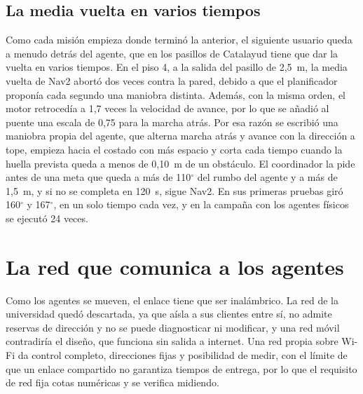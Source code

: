 \subsection{La media vuelta en varios tiempos}
\label{sec:media-vuelta}

Como cada misión empieza donde terminó la anterior, el siguiente usuario queda a menudo detrás del agente, que en los pasillos de Catalayud tiene que dar la vuelta en varios tiempos. En el piso 4, a la salida del pasillo de 2,5~m, la media vuelta de Nav2 abortó dos veces contra la pared, debido a que el planificador proponía cada segundo una maniobra distinta. Además, con la misma orden, el motor retrocedía a 1,7 veces la velocidad de avance, por lo que se añadió al puente una escala de 0,75 para la marcha atrás. Por esa razón se escribió una maniobra propia del agente, que alterna marcha atrás y avance con la dirección a tope, empieza hacia el costado con más espacio y corta cada tiempo cuando la huella prevista queda a menos de 0,10~m de un obstáculo. El coordinador la pide antes de una meta que queda a más de 110$^\circ$ del rumbo del agente y a más de 1,5~m, y si no se completa en 120~s, sigue Nav2. En sus primeras pruebas giró 160$^\circ$ y 167$^\circ$, en un solo tiempo cada vez, y en la campaña con los agentes físicos se ejecutó 24 veces.

\section{La red que comunica a los agentes}
\label{sec:dos-vehiculos}
\label{sec:red}

Como los agentes se mueven, el enlace tiene que ser inalámbrico. La red de la universidad quedó descartada, ya que aísla a sus clientes entre sí, no admite reservas de dirección y no se puede diagnosticar ni modificar, y una red móvil contradiría el diseño, que funciona sin salida a internet. Una red propia sobre Wi-Fi da control completo, direcciones fijas y posibilidad de medir, con el límite de que un enlace compartido no garantiza tiempos de entrega, por lo que el requisito de red fija cotas numéricas y se verifica midiendo.

